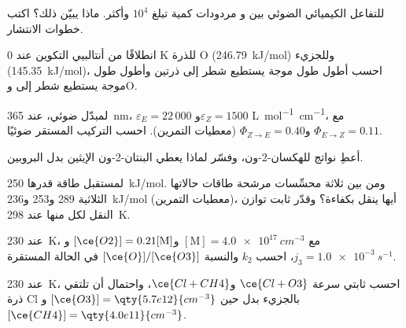 \begin{exercise}[$\star$]\label{exo:b3:photochemistry:3}
للتفاعل الكيميائي الضوئي بين  و مردودات كمية تبلغ $10^4$
وأكثر. ماذا يبيّن ذلك؟ اكتب خطوات الانتشار.
\end{exercise}

\begin{exercise}[$\star$]\label{exo:b3:photochemistry:4}
انطلاقًا من أنتالبيي التكوين عند 0 K للذرة O (\qty{246.79}{kJ/mol}) وللجزيء 
(\qty{145.35}{kJ/mol})، احسب أطول طول موجة يستطيع شطر  إلى ذرتين
وأطول طول موجة يستطيع شطر  إلى  وO.
\end{exercise}

\begin{exercise}[$\star\star$]\label{exo:b3:photochemistry:5}
لمبدّل ضوئي، عند \qty{365}{nm}، $\varepsilon_E = 22\,000$ و$\varepsilon_Z = 1500$ \unit{L.mol^{-1}.cm^{-1}}، مع
$\Phi_{E\to Z} = 0.11$ و$\Phi_{Z\to E} = 0.40$ (معطيات التمرين). احسب التركيب
المستقر ضوئيًا.
\end{exercise}

\begin{exercise}[$\star\star$]\label{exo:b3:photochemistry:6}
أعطِ نواتج  للهكسان-2-ون، وفسّر
لماذا يعطي البنتان-2-ون الإيثين بدل البروبين.
\end{exercise}

\begin{exercise}[$\star\star$]\label{exo:b3:photochemistry:7}
لمستقبل طاقة  قدرها \qty{250}{kJ/mol}. ومن بين ثلاثة محسِّسات
مرشحة طاقات حالاتها الثلاثية 289 و253 و\qty{236}{kJ/mol} (معطيات
التمرين)، أيها ينقل بكفاءة؟ وقدّر ثابت توازن
النقل لكل منها عند \qty{298}{K}.
\end{exercise}

\begin{exercise}[$\star\star$]\label{exo:b3:photochemistry:8}
عند \qty{230}{K}، مع $[\mathrm M] = \qty{4.0e17}{cm^{-3}}$ و$[\ce{O2}] = 0.21[\mathrm M]$ و$j_3 = \qty{1.0e-3}{s^{-1}}$،
احسب $k_2$ والنسبة $[\ce{O}]/[\ce{O3}]$ في الحالة المستقرة.
\end{exercise}

\begin{exercise}[$\star\star$]\label{exo:b3:photochemistry:9}
عند \qty{230}{K}، احسب ثابتي سرعة $\ce{Cl + O3}$ و$\ce{Cl + CH4}$، 
واحتمال أن تلتقي ذرة Cl بالجزيء  بدل  حين $[\ce{O3}] = \qty{5.7e12}{cm^{-3}}$
و$[\ce{CH4}] = \qty{4.0e11}{cm^{-3}}$.
\end{exercise}

